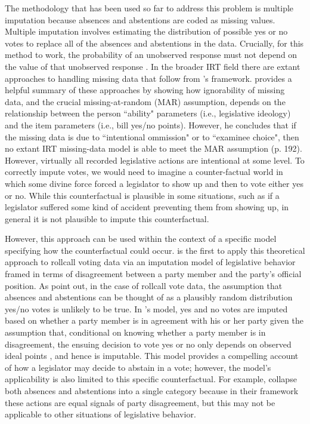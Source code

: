 	
The methodology that has been used so far to address this problem is multiple imputation because absences and abstentions are coded as missing values. Multiple imputation involves estimating the distribution of possible yes or no votes to replace all of the absences and abstentions in the data. Crucially, for this method to work, the probability of an unobserved response must not depend on the value of that unobserved response \parencite{rubin2002}. 	In the broader IRT field there are extant approaches to handling missing data that follow from \textcite{rubin2002}'s framework. \textcite{mislevy2016} provides a helpful summary of these approaches by showing how ignorability of missing data, and the crucial missing-at-random (MAR) assumption, depends on the relationship between the person ``ability" parameters (i.e., legislative ideology) and the item parameters (i.e., bill yes/no points). However, he concludes that if the missing data is due to ``intentional ommission" or to ``examinee choice", then no extant IRT missing-data model is able to meet the MAR assumption (p. 192). However, virtually all recorded legislative actions are intentional at some level. To correctly impute votes, we would need to imagine a counter-factual world in which some divine force forced a legislator to show up and then to vote either yes or no. While this counterfactual is plausible in some situations, such as if a legislator suffered some kind of accident preventing them from showing up, in general it is not plausible to impute this counterfactual.
	
	However, this approach can be used within the context of a specific model specifying how the counterfactual could occur. \textcite{rosas2015} is the first to apply this theoretical approach to rollcall voting data via an imputation model of legislative behavior framed in terms of disagreement between a party member and the party's official position.  As \textcite{rosas2015} point out, in the case of rollcall vote data, the assumption that absences and abstentions can be thought of as a plausibly random distribution yes/no votes is unlikely to be true. In \citeauthor{rosas2015}'s model, yes and no votes are imputed based on whether a party member is in agreement with his or her party given the assumption that, conditional on knowing whether a party member is in disagreement, the ensuing decision to vote yes or no only depends on observed ideal points \parencite{rubin2002}, and hence is imputable. This model provides a compelling account of how a legislator may decide to abstain in a vote; however, the model's applicability is also limited to this specific counterfactual. For example, \citeauthor{rosas2015} collapse both absences and abstentions into a single category because in their framework these actions are equal signals of party disagreement, but this may not be applicable to other situations of legislative behavior.
	
